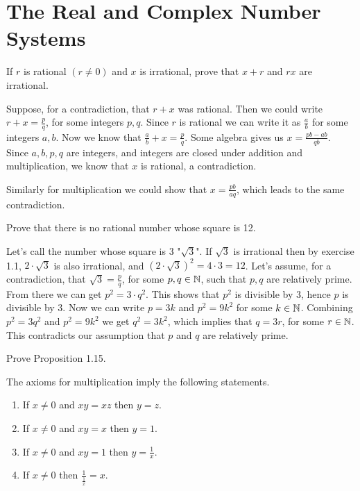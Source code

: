 \section{The Real and Complex Number Systems}


\begin{problem}
If $r$ is rational $(r \neq 0)$ and $x$ is irrational, prove that $x + r$ and $rx$ are irrational.
\end{problem}

\begin{solution}
Suppose, for a contradiction, that $r + x$ was rational.
Then we could write $r + x = \frac{p}{q}$, for some integers $p,q$.
Since $r$ is rational we can write it as $\frac{a}{b}$ for some integers $a,b$.
Now we know that $\frac{a}{b} + x = \frac{p}{q}$.
Some algebra gives us $x=\frac{pb-ab}{qb}$.
Since $a,b,p,q$ are integers, and integers are closed under addition and multiplication, we know that $x$ is rational, a contradiction.

Similarly for multiplication we could show that $x=\frac{pb}{aq}$, which leads to the same contradiction.
\end{solution}

\begin{problem}
Prove that there is no rational number whose square is 12.
\end{problem}

\begin{solution}
Let's call the number whose square is $3$ "$\sqrt{3}$".
If $\sqrt{3}$ is irrational then by exercise 1.1, $2 \cdot \sqrt{3}$ is also irrational, and $(2 \cdot \sqrt{3})^2 = 4 \cdot 3 = 12$.
Let's assume, for a contradiction, that $\sqrt{3} = \frac{p}{q}$, for some $p,q \in \mathbb{N}$, such that $p,q$ are relatively prime.
From there we can get $p^2 = 3 \cdot q^2$. This shows that $p^2$ is divisible by $3$, hence $p$ is divisible by 3. Now we can write $p = 3k$ and $p^2 = 9k^2$ for some $k \in \mathbb{N}$.
Combining $p^2 = 3q^2$ and $p^2 = 9k^2$ we get $q^2 = 3k^2$, which implies that $q = 3r$, for some $r \in \mathbb{N}$.
This contradicts our assumption that $p$ and $q$ are relatively prime.
\end{solution}

\begin{problem}
Prove Proposition 1.15.

The axioms for multiplication imply the following statements.
\begin{enumerate}[label=(\alph*)]
\item If $x \neq 0$ and $xy = xz$ then $y = z$.
\item If $x \neq 0$ and $xy = x$ then $y = 1$.
\item If $x \neq 0$ and $xy = 1$ then $y = \frac{1}{x}$.
\item If $x \neq 0$ then $\frac{1}{\frac{1}{x}} = x$.
\end{enumerate}
\end{problem}

